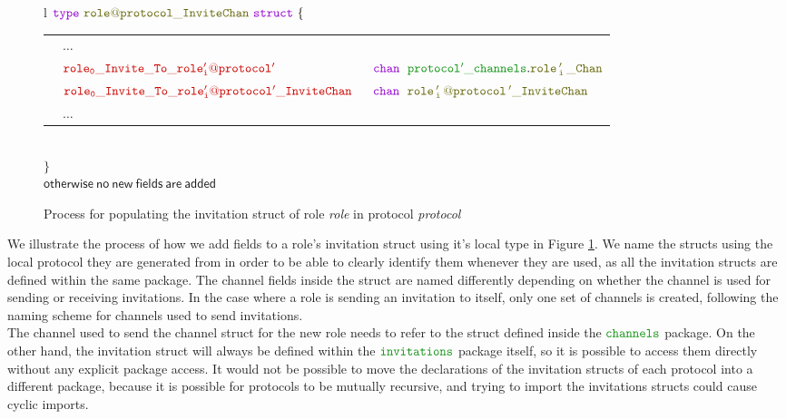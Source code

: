\documentclass[12pt,twoside]{report}
\begin{document}
\begin{figure}[!h]
\begin{center}
\begin{tabular}{l}
            {\footnotesize
            $\gotype\ \structname{\localprotocol{role}{protocol}\_InviteChan}\ \gostruct\ \{$}\\[3pt]

            {\footnotesize
            \begin{tabular}{lll}
                \indent & $\dots$ & \\[9pt]
                \indent & $\structfield{role_0\_Invite\_To\_\localprotocol{role'_i}{protocol'}}$\ &$\gochan\ \;\pkgstructaccess{protocol'\_channels}{role\,'_i\,\_Chan}$\\
                \indent & $\structfield{role_0\_Invite\_To\_\localprotocol{role'_i}{protocol'}\_InviteChan}$\ &$\gochan\ \; \structname{\localprotocol{role\,'_i\,}{protocol\,'}\_InviteChan}$\\
                [7pt]
                \indent & $\dots$ & 
            \end{tabular}}\\
            {\footnotesize$\}$}\\[6pt]
            
            $\mathsf{otherwise\ no\ new\ fields\ are\ added}$
            
        \end{tabular}
    \end{center}
    \caption{Process for populating the invitation struct of role \textit{role} in protocol \textit{protocol}}
    \label{invitation-struct-gen}
\end{figure}

We illustrate the process of how we add fields to a role's invitation struct using it's local type in Figure \ref{invitation-struct-gen}. We name the structs using the local protocol they are generated from in order to be able to clearly identify them whenever they are used, as all the invitation structs are defined within the same package. The channel fields inside the struct are named differently depending on whether the channel is used for sending or receiving invitations. In the case where a role is sending an invitation to itself, only one set of channels is created, following the naming scheme for channels used to send invitations.\\

The channel used to send the channel struct for the new role needs to refer to the struct defined inside the $\pkgname{channels}$ package. On the other hand, the invitation struct will always be defined within the $\pkgname{invitations}$ package itself, so it is possible to access them directly without any explicit package access. It would not be possible to move the declarations of the invitation structs of each protocol into a different package, because it is possible for protocols to be mutually recursive, and trying to import the invitations structs could cause cyclic imports.\\
\end{document}
